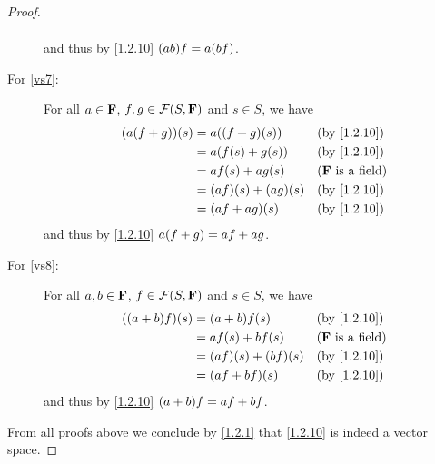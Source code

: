 \begin{proof}
\begin{description}
\begin{align*}
            \end{align*}
            and thus by \cref{1.2.10} \(\p{ab} f = a \p{bf}\).
        \item[For \ref{vs7}:]
            For all \(a \in \mathbf{F}\), \(f, g \in \mathcal{F}\p{S, \F}\) and \(s \in S\), we have
            \begin{align*}
                \p{a \p{f + g}}\p{s} & = a \p{\p{f + g}\p{s}}      &  & \text{(by \cref{1.2.10})}  \\
                                     & = a \p{f\p{s} + g\p{s}}     &  & \text{(by \cref{1.2.10})}  \\
                                     & = af\p{s} + ag\p{s}         &  & \text{(\(\F\) is a field)} \\
                                     & = \p{af}\p{s} + \p{ag}\p{s} &  & \text{(by \cref{1.2.10})}  \\
                                     & = \p{af + ag}\p{s}          &  & \text{(by \cref{1.2.10})}
            \end{align*}
            and thus by \cref{1.2.10} \(a \p{f + g} = af + ag\).
        \item[For \ref{vs8}:]
            For all \(a, b \in \mathbf{F}\), \(f \in \mathcal{F}\p{S, \F}\) and \(s \in S\), we have
            \begin{align*}
                \p{\p{a + b} f}\p{s} & = \p{a + b} f\p{s}          &  & \text{(by \cref{1.2.10})}  \\
                                     & = af\p{s} + bf\p{s}         &  & \text{(\(\F\) is a field)} \\
                                     & = \p{af}\p{s} + \p{bf}\p{s} &  & \text{(by \cref{1.2.10})}  \\
                                     & = \p{af + bf}\p{s}          &  & \text{(by \cref{1.2.10})}
            \end{align*}
            and thus by \cref{1.2.10} \(\p{a + b} f = af + bf\).
    \end{description}
    From all proofs above we conclude by \cref{1.2.1} that \cref{1.2.10} is indeed a vector space.
\end{proof}

